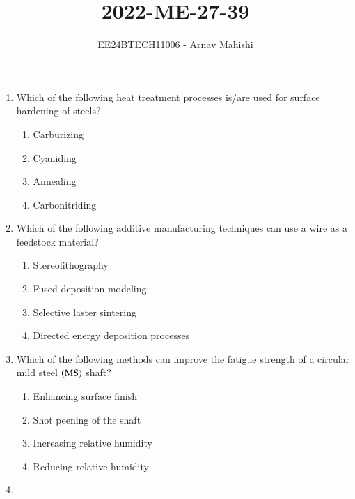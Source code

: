 \documentclass[journal]{IEEEtran}
\begin{document}

\vspace{3cm}

\title{2022-ME-27-39}
\author{EE24BTECH11006 - Arnav Mahishi}
{\let\newpage\relax\maketitle}
\begin{enumerate}
\item{
Which of the following heat treatment processes is/are used for surface hardening of steels?
\begin{multicols}{4}
\begin{enumerate}
\item Carburizing
\item Cyaniding
\item Annealing 
\item Carbonitriding
\end{enumerate}
\end{multicols}
}
\item{
Which of the following additive manufacturing techniques can use a wire as a feedstock material?
\begin{multicols}{2}
\begin{enumerate}
\item Stereolithography
\item Fused deposition modeling
\item Selective laster sintering
\item Directed energy deposition processes
\end{enumerate}
\end{multicols}}
\item{
Which of the following methods can improve the fatigue strength of a circular mild steel $\left(\text{MS}\right)$ shaft?
\begin{multicols}{4}
\begin{enumerate}
\item Enhancing surface finish
\item Shot peening of the shaft
\item Increasing relative humidity
\item Reducing relative humidity
\end{enumerate}
\end{multicols}
}
\item{
}
\end{enumerate}
\end{document}
